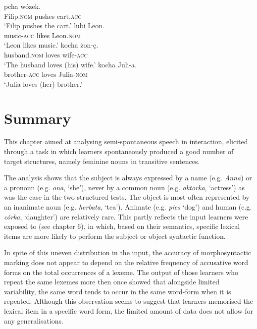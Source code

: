 \ea%
    \label{ex:07:11}
    \ea\label{ex:07:11a}
        {pcha}    {wózek}.\\
            Filip\textsc{.nom}  pushes  cart\textsc{.acc}\\
    \glt    ‘Filip pushes the cart.’
    \ex\label{ex:07:11b}
      {lubi}  {Leon}.\\
            music-\textsc{acc}  likes  Leon\textsc{.nom}\\
    \glt    ‘Leon likes music.’
    \ex\label{ex:07:11c}
          {kocha}  {żon-ę}.\\
            husband\textsc{.nom}  loves  wife-\textsc{acc}\\
    \glt    ‘The husband loves (his) wife.’
    \ex\label{ex:07:11d}
        {kocha}  {Juli-a}.\\
            brother-\textsc{acc}  loves  Julia-\textsc{nom}\\
    \glt    ‘Julia loves (her) brother.’
    \z
\z

\section{Summary}\label{sec:07:6}

This chapter aimed at analysing semi-spontaneous speech in interaction, elicited through a task in which learners spontaneously produced a good number of target structures, namely feminine nouns in transitive sentences.

The analysis shows that the subject is always expressed by a name (e.g. \textit{Anna}) or a pronoun (e.g. \textit{ona}, ‘she’), never by a common noun (e.g. \textit{aktorka}, ‘actress’) as was the case in the two structured tests. The object is most often represented by an inanimate noun (e.g. \textit{herbata}, ‘tea’). Animate (e.g. \textit{pies} ‘dog’) and human (e.g. \textit{córka}, ‘daughter’) are relatively rare. This partly reflects the input learners were exposed to (see chapter 6), in which, based on their semantics, specific lexical items are more likely to perform the subject or object syntactic function.

In spite of this uneven distribution in the input, the accuracy of morphosyntactic marking does not appear to depend on the relative frequency of accusative word forms on the total occurrences of a lexeme. The output of those learners who repeat the same lexemes more then once showed that alongside limited variability, the same word tends to occur in the same word-form when it is repeated. Although this observation seems to suggest that learners memorised the lexical item in a specific word form, the limited amount of data does not allow for any generalisations.

